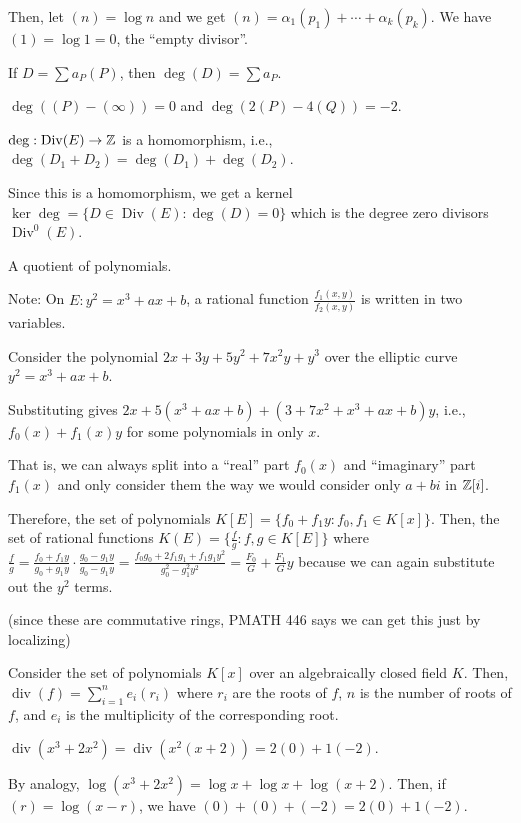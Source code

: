 \documentclass[notes]{agony}
\newcommand{\Div}{\operatorname{Div}}
\begin{document}
Then, let $(n) = \log n$ and we get $(n) = \alpha_1 (p_1) + \dotsb + \alpha_k (p_k)$.
We have $(1) = \log 1 = 0$, the ``empty divisor''.

\begin{defn}[degree]
  If $D = \sum a_P(P)$, then $\deg(D) = \sum a_P$.
\end{defn}
\begin{example}
  $\deg((P) - (\infty)) = 0$ and $\deg(2(P) - 4(Q)) = -2$.
\end{example}

\begin{prop}
  $\deg : \Div(E) \to \Z$ is a homomorphism, i.e.,
  $\deg(D_1 + D_2) = \deg(D_1) + \deg(D_2)$.
\end{prop}

Since this is a homomorphism, we get a kernel
$\ker \deg = \{ D \in \Div(E) : \deg(D) = 0 \}$
which is the degree zero divisors $\Div^0(E)$.

\begin{defn}
  A quotient of polynomials.
\end{defn}

Note: On $E : y^2 = x^3 + ax + b$, a rational function
$\frac{f_1(x,y)}{f_2(x,y)}$ is written in two variables.

\begin{example}
  Consider the polynomial $2x + 3y + 5y^2 + 7x^2y + y^3$
  over the elliptic curve $y^2 = x^3 + ax + b$.

  Substituting gives $2x + 5(x^3 + ax + b) + (3 + 7x^2 + x^3 + ax + b)y$,
  i.e., $f_0(x) + f_1(x)y$ for some polynomials in only $x$.
\end{example}

That is, we can always split into a ``real'' part $f_0(x)$ and ``imaginary'' part $f_1(x)$
and only consider them the way we would consider only $a + bi$ in $\mathbb{Z}[i]$.

Therefore, the set of polynomials $K[E] = \{f_0 + f_1 y : f_0,f_1 \in K[x]\}$.
Then, the set of rational functions $K(E) = \{\frac{f}{g} : f,g \in K[E]\}$
where $\frac{f}{g} = \frac{f_0+f_1y}{g_0+g_1y}\cdot\frac{g_0-g_1y}{g_0-g_1y}
  = \frac{f_0g_0 + 2f_1g_1 + f_1g_1 y^2}{g_0^2-g_1^2y^2} = \frac{F_0}{G} + \frac{F_1}{G}y$
because we can again substitute out the $y^2$ terms.

(since these are commutative rings, PMATH 446 says we can get this just by localizing)

\renewcommand{\div}{\operatorname{div}}
\begin{defn}
  Consider the set of polynomials $K[x]$ over an algebraically closed field $K$.
  Then, $\div(f) = \sum_{i=1}^n e_i(r_i)$ where $r_i$ are the roots of $f$,
  $n$ is the number of roots of $f$, and $e_i$ is the multiplicity of the corresponding root.
\end{defn}
\begin{example}
  $\div(x^3 + 2x^2) = \div(x^2(x+2)) = 2(0) + 1(-2)$.

  By analogy, $\log(x^3 + 2x^2) = \log x + \log x + \log(x+2)$.
  Then, if $(r) = \log(x-r)$, we have $(0) + (0) + (-2) = 2(0) + 1(-2)$.
\end{example}
\end{document}
